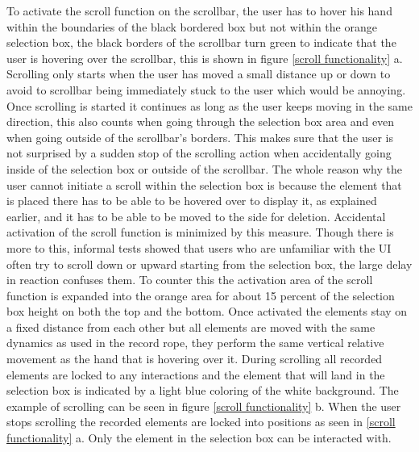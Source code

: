 To activate the scroll function on the scrollbar, the user has to hover his hand within the boundaries of the black bordered box but not within the orange selection box, the black borders of the scrollbar turn green to indicate that the user is hovering over the scrollbar, this is shown in figure \ref{scroll functionality} a. Scrolling only starts when the user has moved a small distance up or down to avoid to scrollbar being immediately stuck to the user which would be annoying. Once scrolling is started it continues as long as the user keeps moving in the same direction, this also counts when going through the selection box area and even when going outside of the scrollbar's borders. This makes sure that the user is not surprised by a sudden stop of the scrolling action when accidentally going inside of the selection box or outside of the scrollbar. The whole reason why the user cannot initiate a scroll within the selection box is because the element that is placed there has to be able to be hovered over to display it, as explained earlier, and it has to be able to be moved to the side for deletion. Accidental activation of the scroll function is minimized by this measure. Though there is more to this, informal tests showed that users who are unfamiliar with the UI often try to scroll down or upward starting from the selection box, the large delay in reaction confuses them. To counter this the activation area of the scroll function is expanded into the orange area for about 15 percent of the selection box height on both the top and the bottom. Once activated the elements stay on a fixed distance from each other but all elements are moved with the same dynamics as used in the record rope, they perform the same vertical relative movement as the hand that is hovering over it. During scrolling all recorded elements are locked to any interactions and the element that will land in the selection box is indicated by a light blue coloring of the white background. The example of scrolling can be seen in figure \ref{scroll functionality} b. When the user stops scrolling the recorded elements are locked into positions as seen in \ref{scroll functionality} a. Only the element in the selection box can be interacted with.\\

